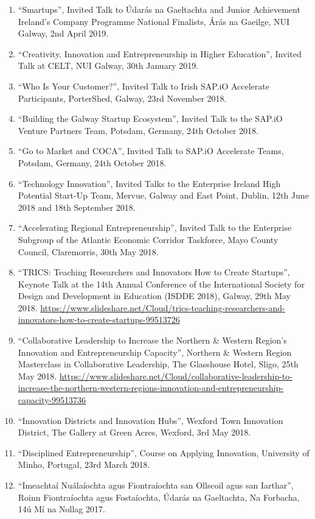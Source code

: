 \documentclass[10pt,a4paper]{res} %
\begin{document}
\begin{resume}
\begin{enumerate}
\item ``Smartups'', Invited Talk to \'{U}dar\'{a}s na Gaeltachta and Junior Achievement Ireland's Company Programme National Finalists, \'{A}r\'{a}s na Gaeilge, NUI Galway, 2nd April 2019.
\item ``Creativity, Innovation and Entrepreneurship in Higher Education'', Invited Talk at CELT, NUI Galway, 30th January 2019.
\item ``Who Is Your Customer?'', Invited Talk to Irish SAP.iO Accelerate Participants, PorterShed, Galway, 23rd November 2018.
\item ``Building the Galway Startup Ecosystem'', Invited Talk to the SAP.iO Venture Partners Team, Potsdam, Germany, 24th October 2018.
\item ``Go to Market and COCA'', Invited Talk to SAP.iO Accelerate Teams, Potsdam, Germany, 24th October 2018.
\item ``Technology Innovation'', Invited Talks to the Enterprise Ireland High Potential Start-Up Team, Mervue, Galway and East Point, Dublin, 12th June 2018 and 18th September 2018.
\item ``Accelerating Regional Entrepreneurship'', Invited Talk to the Enterprise Subgroup of the Atlantic Economic Corridor Taskforce, Mayo County Council, Claremorris, 30th May 2018.
\item ``TRICS: Teaching Researchers and Innovators How to Create Startups'', Keynote Talk at the 14th Annual Conference of the International Society for Design and Development in Education (ISDDE 2018), Galway, 29th May 2018. \url{https://www.slideshare.net/Cloud/trics-teaching-researchers-and-innovators-how-to-create-startups-99513726}
\item ``Collaborative Leadership to Increase the Northern \& Western Region's Innovation and Entrepreneurship Capacity'', Northern \& Western Region Masterclass in Collaborative Leadership, The Glasshouse Hotel, Sligo, 25th May 2018. \url{https://www.slideshare.net/Cloud/collaborative-leadership-to-increase-the-northern-western-regions-innovation-and-entrepreneurship-capacity-99513736}
\item ``Innovation Districts and Innovation Hubs'', Wexford Town Innovation District, The Gallery at Green Acres, Wexford, 3rd May 2018.
\item ``Disciplined Entrepreneurship'', Course on Applying Innovation, University of Minho, Portugal, 23rd March 2018.
\item ``Imeachta\'{i} Nu\'{a}la\'{i}ochta agus Fiontra\'{i}ochta san Ollscoil agus san Iarthar'', Roinn Fiontra\'{i}ochta agus Fosta\'{i}ochta, \'{U}dar\'{a}s na Gaeltachta, Na Forbacha, 14\'{u} M\'{i} na Nollag 2017.

\end{enumerate}
\end{resume}
\end{document}
